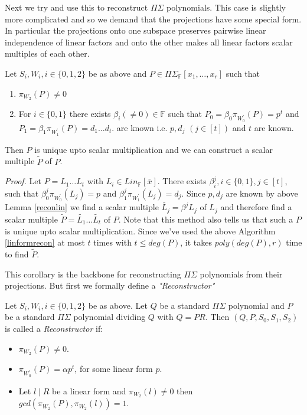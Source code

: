 \documentclass[letterpaper,USenglish,numberwithinsect]{lipics}
\newcommand{\F}{\mathbb{F}}
\newcommand{\B}[1]{\bar{#1}}
\begin{document}
Next we try and use this to reconstruct $\Pi\Sigma$ polynomials. This case is slightly more complicated and so
we demand that the projections have some special form. In particular the projections onto one subspace preserves pairwise linear
independence of linear factors and onto the other makes all linear factors scalar multiples of each other.
\begin{corollary}\label{polyrecon}
Let $S_i,W_i, i\in \{0,1,2\}$ be as above and $P\in \Pi\Sigma_\F[x_1,\ldots,x_r]$
such that
\begin{enumerate}
\item $\pi_{W_2}(P)\neq 0$
\item For $i\in \{0,1\}$ there exists $\beta_i (\neq 0) \in \F$ such that
$P_0=\beta_0 \pi_{W_0^\prime}(P) = p^{t}$ and $P_1=\beta_1
\pi_{W_1^\prime}(P)=d_1\ldots d_t$. are known i.e.
$p,d_j$ $(j\in [t])$ and $t$ are known.
\end{enumerate}
Then $P$ is unique upto scalar multiplication and we can construct a scalar
multiple $\tilde{P}$ of $P$.
\end{corollary}

\emph{Proof.}
Let $P = L_1\ldots L_t$ with $L_i\in Lin_\F[\B{x}]$. There exists $\beta^j_i,
i\in \{0,1\}, j\in [t]$, such that $\beta^j_0 \pi_{W_0^\prime}(L_j)= p$ and
$\beta^j_1 \pi_{W_1^\prime}(L_j) = d_j$.
Since $p,d_j$ are known by above Lemma \ref{reconlin} we find a scalar multiple
$\tilde{L_j}=\beta^j L_j$ of $L_j$
and therefore find a scalar multiple $\tilde{P} = \tilde{L_1}\ldots\tilde{L_t}$
of $P$. Note that this method also tells us that such a $P$ is unique upto scalar
multiplication. Since we've used the above Algorithm \ref{linformrecon} at most $t$
times with $t\leq deg(P)$, it takes $poly(deg(P),r)$ time to find $\tilde P$.


This corollary is the backbone for reconstructing $\Pi\Sigma$ polynomials from their projections. But first we formally
define a \emph{"Reconstructor"}

\begin{definition}[Reconstructor] \label{Reconstructor} Let $S_i,W_i, i\in
\{0,1,2\}$ be as above. Let $Q$ be a standard $\Pi\Sigma$ polynomial and $P$ be
a standard $\Pi\Sigma$ polynomial
dividing $Q$ with $Q=PR$. Then $(Q,P,S_0,S_1,S_2)$ is called a
\emph{Reconstructor} if:

\begin{itemize}
\item $\pi_{W_2}(P)\neq 0$.
\item $\pi_{W_0^\prime}(P) = \alpha p^t$, for some linear form $p$.
\item Let $l\mid R$ be a linear form and $\pi_{W_2}(l)\neq 0$ then $gcd
(\pi_{W_2}(P),\pi_{W_2}(l)) =1$.

\end{itemize}
\end{definition}
\end{document}
